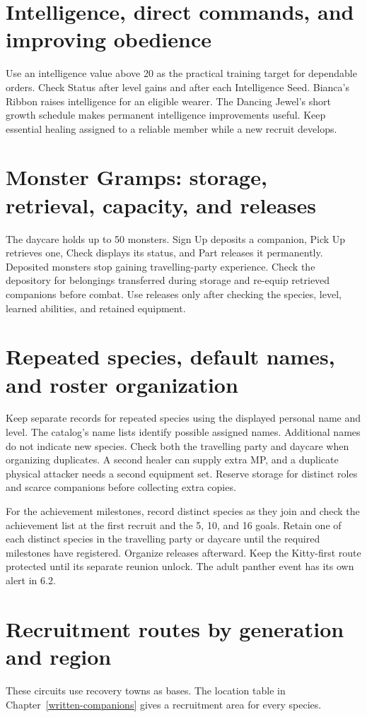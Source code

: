 \section{Intelligence, direct commands, and improving obedience}
Use an intelligence value above 20 as the practical training target for
dependable orders. Check Status after level gains and after each Intelligence
Seed. Bianca's Ribbon raises intelligence for an eligible wearer. The Dancing
Jewel's short growth schedule makes permanent intelligence improvements useful.
Keep essential healing assigned to a reliable member while a new recruit develops.

\section{Monster Gramps: storage, retrieval, capacity, and releases}
The daycare holds up to 50 monsters. Sign Up deposits a companion, Pick Up
retrieves one, Check displays its status, and Part releases it permanently.
Deposited monsters stop gaining travelling-party experience. Check the
depository for belongings transferred during storage and re-equip retrieved
companions before combat. Use releases only after checking the species, level,
learned abilities, and retained equipment.

\section{Repeated species, default names, and roster organization}
Keep separate records for repeated species using the displayed personal name
and level. The catalog's name lists identify possible assigned names.
Additional names do not indicate new species. Check both the travelling party
and daycare when organizing duplicates. A second healer can supply extra MP,
and a duplicate physical attacker needs a second equipment set. Reserve
storage for distinct roles and scarce companions before collecting extra copies.

For the achievement milestones, record distinct species as they join and
check the achievement list at the first recruit and the 5, 10, and 16 goals.
Retain one of each distinct species in the travelling party or daycare
until the required milestones have registered. Organize releases afterward.
Keep the Kitty-first route protected until its separate reunion unlock.
The adult panther event has its own alert in 6.2.

\section{Recruitment routes by generation and region}
These circuits use recovery towns as bases. The location table in
Chapter~\ref{written-companions} gives a recruitment area for every species.

